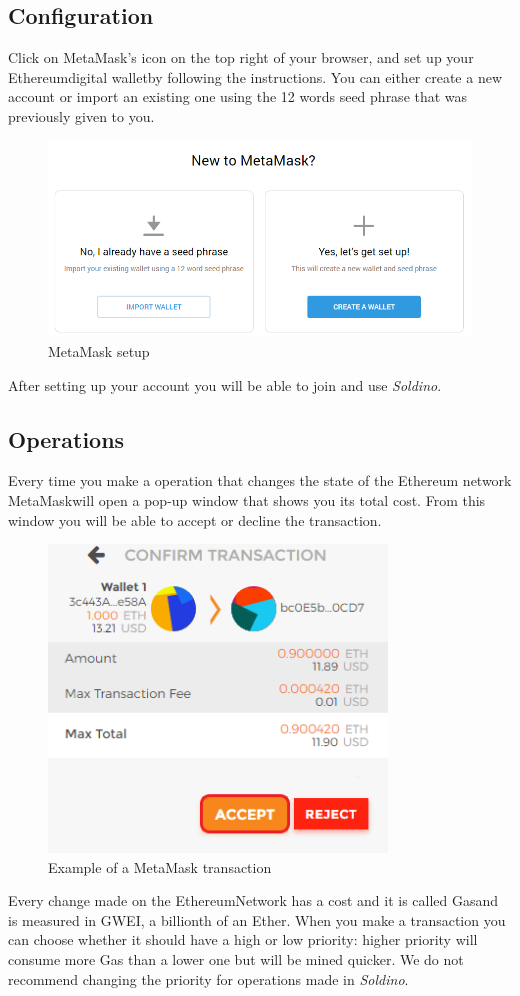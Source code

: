 	\subsection{Configuration}
	Click on MetaMask's icon on the top right of your browser, and set up your 
	Ethereum\glosp digital wallet\glosp by following the instructions. You can either 
	create a new account or import an existing one using the 12 words seed phrase
	that was previously given to you.
	\begin{figure}[H]
		\includegraphics[width=15cm]{res/images/metamask_select.png}
		\centering
		\caption{MetaMask setup}
	\end{figure}
	\noindent After setting up your account you will be able to join and use 
	\textit{Soldino}.
	\subsection{Operations}
	Every time you make a operation that changes the state of the Ethereum\glosp 
	network MetaMask\glosp will open a pop-up window that shows you its total cost.
	From this window you will be able to accept or decline the transaction.\\
	\begin{figure}[H]
		\includegraphics[width=9cm]{res/images/metamask_transaction.png}
		\centering
		\caption{Example of a MetaMask transaction}
	\end{figure}
	\noindent 
	Every change made on the Ethereum\glosp Network has a cost and it is called 
	Gas\glosp and is measured in GWEI, a billionth of an Ether\glo. When you 
	make a transaction you can choose whether it should have a high or low 
	priority: higher priority will consume more Gas than a lower one but will 
	be mined quicker. We do not recommend changing the priority for 
	operations made in \textit{Soldino}.
